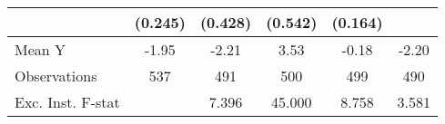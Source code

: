 {\begin{tabular}{l*{5}{c}}
            &     (0.245)         &     (0.428)         &     (0.542)         &     (0.164)         &                     \\
\midrule
Mean Y      &       -1.95         &       -2.21         &        3.53         &       -0.18         &       -2.20         \\
Observations&         537         &         491         &         500         &         499         &         490         \\
Exc. Inst. F-stat&                     &       7.396         &      45.000         &       8.758         &       3.581         \\
\bottomrule
\end{tabular}
}
